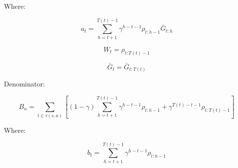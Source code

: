 \documentclass[11pt]{article}
\begin{document}
    Where:

    \begin{equation}
        a_t = \sum_{h=t+1}^{T(t)-1} \gamma^{h-t-1} \rho_{t:h-1} \bar{G}_{t:h}
    \end{equation}

    \begin{equation}
        W_t = \rho_{t:T(t)-1}
    \end{equation}

    \begin{equation}
       \bar{G}_t = \bar{G}_{t:T(t)}
    \end{equation}

    Denominator:

    \begin{equation}
        B_n =  \sum_{t \in \tau(s,a) } [ (1-\gamma) \sum_{h=t+1}^{T(t)-1} \gamma^{h-t-1} \rho_{t:h-1} + \gamma^{T(t)-t-1} \rho_{t:T(t)-1} ]
    \end{equation}

    Where:

    \begin{equation}
        b_t = \sum_{h=t+1}^{T(t)-1} \gamma^{h-t-1} \rho_{t:h-1}
    \end{equation}
\end{document}
